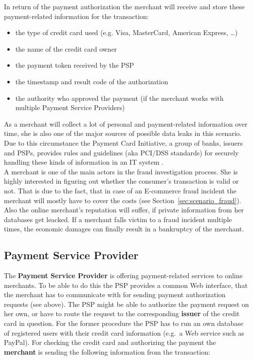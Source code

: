 In return of the payment authorization the merchant will receive and store these  payment-related information for the transaction:\@

\begin{itemize}
		\item the type of credit card used (e.g. Visa, MasterCard, American Express, \ldots)
		\item the name of the credit card owner
		\item the payment token received by the \gls{PSP}
		\item the timestamp and result code of the authorization
		\item the authority who approved the payment (if the merchant works with multiple Payment Service Providers)
\end{itemize}

As a merchant will collect a lot of personal and payment-related information over time, she is also one of the major sources of possible data leaks in this scenario. Due to this circumstance the Payment Card Initiative, a group of banks, issuers and \gls{PSP}s, provides rules and guidelines (aka PCI/DSS standards) for securely handling these kinds of information in an IT system \citep{virtue2009payment}. \\

A merchant is one of the main actors in the fraud investigation process. She is highly interested in figuring out whether the consumer's transaction is valid or not. That is due to the fact, that in case of an E-commerce fraud incident the merchant will mostly have to cover the costs (see Section~\ref{sec:scenario_fraud}). Also the online merchant's reputation will suffer, if private information from her databases get leacked. If a merchant falls victim to a fraud incident multiple times, the economic damages can finally result in a bankruptcy of the merchant.


\subsection{Payment Service Provider}
\label{subsec:stakeholder_psp}

The \textbf{Payment Service Provider} is offering payment-related services to online merchants. To be able to do this the \gls{PSP} provides a common Web interface, that the merchant has to communicate with for sending payment authorization requests (see above). The \gls{PSP} might be able to authorize the payment request on her own, or have to route the request to the corresponding \textbf{issuer} of the credit card in question. For the former procedure the \gls{PSP} has to run an own database of registered users with their credit card information (e.g.\ a Web service such as PayPal). For checking the credit card and authorizing the payment the \textbf{merchant} is sending the following information from the transaction:\@

